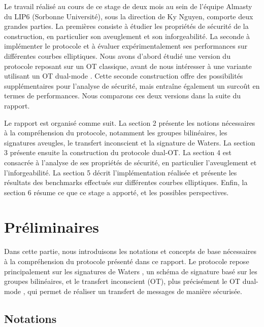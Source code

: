 \documentclass[10pt,a4paper]{article}
\theoremstyle{definition}
\theoremstyle{plain}
\theoremstyle{remark}
\begin{document}
Le travail réalisé au cours de ce stage de deux mois au sein de
l'équipe Almasty du LIP6 (Sorbonne Université), sous la direction de
Ky Nguyen, comporte deux grandes parties. La premières consiste à étudier les
propriétés de sécurité de la construction, en particulier son
aveuglement et son inforgeabilité. La seconde à implémenter le
protocole et à évaluer expérimentalement ses performances sur
différentes courbes elliptiques.
Nous avons d'abord étudié une version du protocole reposant sur un OT
classique, avant de nous intéresser à une variante utilisant un OT
dual-mode \cite{pvw2007}. Cette seconde construction offre des
possibilités supplémentaires pour l'analyse de sécurité, mais entraîne
également un surcoût en termes de performances. Nous comparons ces deux
versions dans la suite du rapport.

Le rapport est organisé comme suit.
La section 2 présente les notions nécessaires à la
compréhension du protocole, notamment les groupes bilinéaires, les
signatures aveugles, le transfert inconscient et la signature de
Waters.
La section 3 présente ensuite la construction du protocole dual-OT.
La section 4 est consacrée à l'analyse de ses propriétés de sécurité,
en particulier l'aveuglement et l'inforgeabilité. La section 5 décrit
l'implémentation réalisée et présente les résultats des benchmarks
effectués sur différentes courbes elliptiques. Enfin, la section 6
résume ce que ce stage a apporté, et les possibles perspectives.
\newpage
\section{Préliminaires}

Dans cette partie, nous introduisons les notations et concepts de base nécessaires à la compréhension du protocole présenté dans ce rapport.
Le protocole repose principalement sur les signatures de Waters \cite{waters2005}, un schéma de signature basé sur les groupes bilinéaires,
et le transfert inconscient (OT), plus précisément le OT dual-mode \cite{pvw2007}, qui permet de réaliser un transfert de messages de manière sécurisée.

\subsection{Notations}
\end{document}
